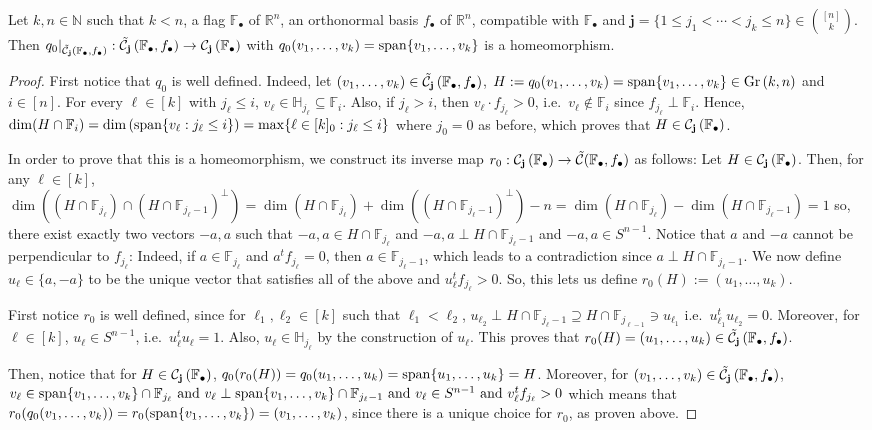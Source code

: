 \begin{lemma}\label{lem:cells_from_stiefel_to_gr} Let $k,n\in\mathbb{N}$ such that $k<n$, a flag $\mathbb{F}_{\bullet}$ of $\mathbb{R}^n$, an orthonormal basis $f_{\bullet}$ of $\mathbb{R}^n$, compatible with $\mathbb{F}_{\bullet}$ and $\mathbf{j}=\{1\leq j_1<\cdots<j_k\leq n\}\in\binom{[n]}{k}$. Then $q_0|_{\tilde{\mathcal{C}}_{\mathbf{j}}\left(\mathbb{F}_{\bullet},f_{\bullet}\right)}:\tilde{\mathcal{C}}_{\mathbf{j}}\left(\mathbb{F}_{\bullet},f_{\bullet}\right)\to\mathcal{C}_{\mathbf{j}}\left(\mathbb{F}_{\bullet}\right)$ with $q_0(v_1,\ldots,v_k)=\mathrm{span}\{v_1,\ldots,v_k\}$ is a homeomorphism.
\end{lemma}
\begin{proof} First notice that $q_0$ is well defined. Indeed, let $(v_1,\ldots,v_k)\in\tilde{\mathcal{C}}_{\mathbf{j}}\left(\mathbb{F}_{\bullet},f_{\bullet}\right)$,
$H:=q_0(v_1,\ldots,v_k)=\spans\{v_1,\ldots,v_k\}\in\Gr{k}{n}$ and $i\in[n]$. For every $\ell\in[k]$ with $j_{\ell}\leq i$,  $v_{\ell}\in\mathbb{H}_{j_{\ell}}\subseteq\mathbb{F}_i$. Also, if $j_{\ell}>i$, then $v_{\ell}\cdot f_{j_{\ell}}>0$, i.e.\ $v_{\ell}\not\in\mathbb{F}_i$ since $f_{j_{\ell}}\perp\mathbb{F}_i$. Hence,
$\dim(H\cap\mathbb{F}_i)=\dim\left(\mathrm{span}\{v_{\ell}:j_{\ell}\leq i\}\right)=\max\{\ell\in[k]_0:j_{\ell}\leq i\}$
where $j_0=0$ as before, which proves that $H\in\mathcal{C}_{\mathbf{j}}\left(\mathbb{F}_{\bullet}\right)$.

In order to prove that this is a homeomorphism, we construct its inverse map $r_0:\mathcal{C}_{\mathbf{j}}\left(\mathbb{F}_{\bullet}\right)\to\tilde{\mathcal{C}}(\mathbb{F}_{\bullet},f_{\bullet})$ as follows: Let $H\in\mathcal{C}_{\mathbf{j}}\left(\mathbb{F}_{\bullet}\right)$. Then, for any $\ell\in[k]$, $\dim\left((H\cap\mathbb{F}_{j_{\ell}})\cap(H\cap\mathbb{F}_{j_{\ell}-1})^{\perp}\right)=\dim(H\cap\mathbb{F}_{j_{\ell}})+\dim((H\cap\mathbb{F}_{j_{\ell}-1})^{\perp})-n=\dim(H\cap\mathbb{F}_{j_{\ell}})-\dim(H\cap\mathbb{F}_{j_{\ell}-1})=1$ so, there exist exactly two vectors $-a,a$ such that $-a,a\in H\cap\mathbb{F}_{j_{\ell}}$ and $-a,a\perp H\cap\mathbb{F}_{j_{\ell}-1}$ and $-a,a\in S^{n-1}$. Notice that $a$ and $-a$ cannot be perpendicular to $f_{j_{\ell}}$: Indeed, if $a\in\mathbb{F}_{j_{\ell}}$ and $a^tf_{j_{\ell}}=0$, then $a\in\mathbb{F}_{j_{\ell}-1}$, which leads to a contradiction since $a\perp H\cap\mathbb{F}_{j_{\ell}-1}$. We now define $u_{\ell}\in\{a,-a\}$ to be the unique vector that satisfies all of the above and $u_{\ell}^tf_{j_{\ell}}>0$. So, this lets us define $r_0(H):=(u_1,\ldots,u_k)$.

First notice $r_0$ is well defined, since for $\ell_1,\ell_2\in[k]$ such that $\ell_1<\ell_2$,
$u_{\ell_2}\perp H\cap\mathbb{F}_{j_{\ell}-1}\supseteq H\cap\mathbb{F}_{j_{\ell-1}}\ni u_{\ell_1}$
i.e.\ $u_{\ell_1}^tu_{\ell_2}=0$. Moreover, for $\ell\in[k]$, $u_{\ell}\in S^{n-1}$, i.e.\ $u_{\ell}^tu_{\ell}=1$. Also, $u_{\ell}\in\mathbb{H}_{j_{\ell}}$ by the construction of $u_{\ell}$. This proves that $r_0(H)=(u_1,\ldots,u_k)\in\tilde{\mathcal{C}}_{\mathbf{j}}\left(\mathbb{F}_{\bullet},f_{\bullet}\right)$.

Then, notice that for $H\in\mathcal{C}_{\mathbf{j}}\left(\mathbb{F}_{\bullet}\right)$, $q_0(r_0(H))=q_0(u_1,\ldots,u_k)=\mathrm{span}\{u_1,\ldots,u_k\}=H$. Moreover, for $(v_1,\ldots,v_k)\in\tilde{\mathcal{C}}_{\mathbf{j}}\left(\mathbb{F}_{\bullet},f_{\bullet}\right)$, $v_{\ell}\in\mathrm{span}\{v_1,\ldots,v_k\}\cap\mathbb{F}_{j_{\ell}}\text{ and } v_{\ell}\perp\mathrm{span}\{v_1,\ldots,v_k\}\cap\mathbb{F}_{j_{\ell}-1}\text{ and }v_{\ell}\in S^{n-1}\text{ and }v_{\ell}^tf_{j_{\ell}}>0$ which means that $r_0(q_0(v_1,\ldots,v_k))=r_0(\mathrm{span}\{v_1,\ldots,v_k\})=(v_1,\ldots,v_k)$, since there is a unique choice for $r_0$, as proven above.
\end{proof}


